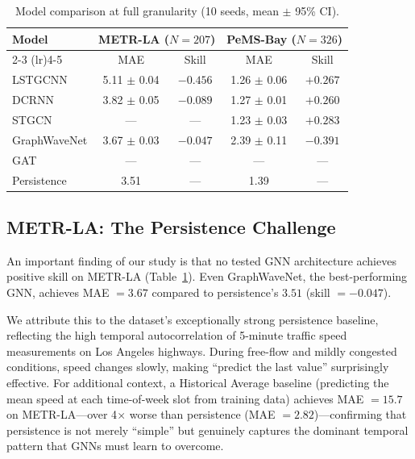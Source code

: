 \documentclass[letterpaper]{article}
\begin{document}
\begin{table}[t]
\small
\centering
\caption{Model comparison at full granularity (10 seeds, mean $\pm$ 95\% CI).}
\label{tab:model_comparison}
\begin{tabular}{lcccc}
\toprule
Model & \multicolumn{2}{c}{METR-LA ($N{=}207$)} & \multicolumn{2}{c}{PeMS-Bay ($N{=}326$)} \\
\cmidrule(lr){2-3} \cmidrule(lr){4-5}
      & MAE & Skill & MAE & Skill \\
\midrule
LSTGCNN      & 5.11 $\pm$ 0.04 & $-0.456$ & 1.26 $\pm$ 0.06 & $+0.267$ \\
DCRNN        & 3.82 $\pm$ 0.05 & $-0.089$ & 1.27 $\pm$ 0.01 & $+0.260$ \\
STGCN        & ---             & ---      & 1.23 $\pm$ 0.03 & $+0.283$ \\
GraphWaveNet & 3.67 $\pm$ 0.03 & $-0.047$ & 2.39 $\pm$ 0.11 & $-0.391$ \\
GAT          & ---             & ---      & ---             & ---      \\
\midrule
Persistence  & 3.51            & ---      & 1.39            & ---      \\
\bottomrule
\end{tabular}
\end{table}

\subsection{METR-LA: The Persistence Challenge}

An important finding of our study is that no tested GNN architecture achieves positive skill on METR-LA (Table~\ref{tab:model_comparison}). Even GraphWaveNet, the best-performing GNN, achieves MAE $= 3.67$ compared to persistence's $3.51$ (skill $= -0.047$).

We attribute this to the dataset's exceptionally strong persistence baseline, reflecting the high temporal autocorrelation of 5-minute traffic speed measurements on Los Angeles highways. During free-flow and mildly congested conditions, speed changes slowly, making ``predict the last value'' surprisingly effective. For additional context, a Historical Average baseline (predicting the mean speed at each time-of-week slot from training data) achieves MAE $= 15.7$ on METR-LA---over 4$\times$ worse than persistence (MAE $= 2.82$)---confirming that persistence is not merely ``simple'' but genuinely captures the dominant temporal pattern that GNNs must learn to overcome.
\end{document}
